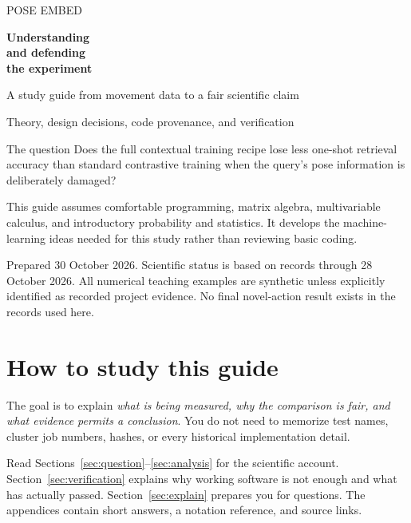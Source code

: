 \documentclass[11pt,letterpaper]{article}
\begin{document}
\hypersetup{pageanchor=false}
\begin{titlepage}
\vspace*{1.3cm}
{\large POSE EMBED\par}
\vspace{0.8cm}
{\Huge\bfseries Understanding\\and defending\\the experiment\par}
\vspace{0.65cm}
{\Large A study guide from movement data to a fair scientific claim\par}
\vspace{1.1cm}
{\large Theory, design decisions, code provenance, and verification\par}
\vspace{0.8cm}
\begin{concept}{The question}
Does the full contextual training recipe lose less one-shot retrieval accuracy
than standard contrastive training when the query's pose information is
deliberately damaged?
\end{concept}
\vfill
This guide assumes comfortable programming, matrix algebra, multivariable
calculus, and introductory probability and statistics. It develops the
machine-learning ideas needed for this study rather than reviewing basic coding.

Prepared 30 October 2026. Scientific status is based on records through
28 October 2026. All numerical teaching examples are synthetic unless explicitly
identified as recorded project evidence. No final novel-action result exists in
the records used here.
\end{titlepage}
\hypersetup{pageanchor=true}
\begingroup
\small
\setlength{\parskip}{0pt}
\tableofcontents
\endgroup
\clearpage
{}
\section*{How to study this guide}
The goal is to explain \emph{what is being measured, why the comparison is fair,
and what evidence permits a conclusion}. You do not need to memorize test names,
cluster job numbers, hashes, or every historical implementation detail.

Read Sections~\ref{sec:question}--\ref{sec:analysis} for the scientific account.
Section~\ref{sec:verification} explains why working software is not enough and
what has actually passed. Section~\ref{sec:explain} prepares you for questions.
The appendices contain short answers, a notation reference, and source links.
\end{document}
